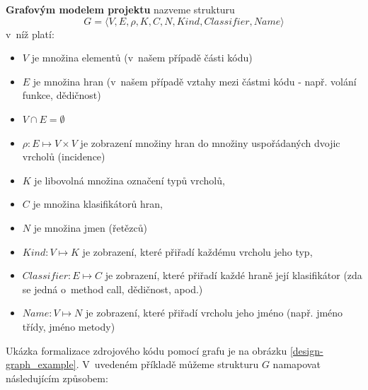 \begin{definition}
\textbf{Grafovým modelem projektu} nazveme strukturu
\begin{displaymath}
  G = \langle V, E, \rho, K, C, N, \mathit{Kind}, \mathit{Classifier}, \mathit{Name}\rangle
  \label{extended_multigraph}
\end{displaymath}
v~níž platí:
\begin{itemize}
\item $V$ je množina elementů (v~našem případě části kódu)
\item $E$ je množina hran (v~našem případě vztahy mezi částmi kódu - např. volání funkce, dědičnost)
\item $V \cap E = \emptyset$
\item $\rho: E \mapsto V \times V$ je zobrazení množiny hran do množiny uspořádaných dvojic vrcholů (incidence)
\item $K$ je libovolná množina označení typů vrcholů,
\item $C$ je množina klasifikátorů hran,
\item $N$ je množina jmen (řetězců)
\item $\mathit{Kind}: V \mapsto K$ je zobrazení, které přiřadí každému vrcholu jeho typ,
\item $\mathit{Classifier}: E \mapsto C$ je zobrazení, které přiřadí každé hraně její klasifikátor (zda se jedná o~method call, dědičnost, apod.)
\item $\mathit{Name}: V \mapsto N$ je zobrazení, které přiřadí vrcholu jeho jméno (např. jméno třídy, jméno metody)
\end{itemize}
\end{definition}

Ukázka formalizace zdrojového kódu pomocí grafu je na obrázku \ref{design-graph_example}. V~uvedeném příkladě můžeme strukturu $G$ namapovat následujícím způsobem:

